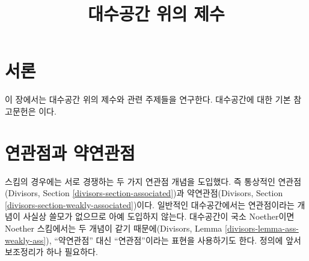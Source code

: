 

%


\title{대수공간 위의 제수}


\maketitle

\label{section-phantom}

\tableofcontents

\section{서론}
\label{section-introduction}

\noindent
이 장에서는 대수공간 위의 제수와 관련 주제들을 연구한다.
대수공간에 대한 기본 참고문헌은 \cite{Kn}이다.








\section{연관점과 약연관점}
\label{section-associated}

\noindent
스킴의 경우에는 서로 경쟁하는 두 가지 연관점 개념을 도입했다.
즉 통상적인 연관점(Divisors, Section
\ref{divisors-section-associated})과 약연관점(Divisors, Section
\ref{divisors-section-weakly-associated})이다.
일반적인 대수공간에서는 연관점이라는 개념이 사실상 쓸모가 없으므로
아예 도입하지 않는다. 대수공간이 국소 Noether이면 Noether 스킴에서는
두 개념이 같기 때문에(Divisors, Lemma
\ref{divisors-lemma-ass-weakly-ass}), ``약연관점'' 대신 ``연관점''이라는
표현을 사용하기도 한다. 정의에 앞서 보조정리가 하나 필요하다.

